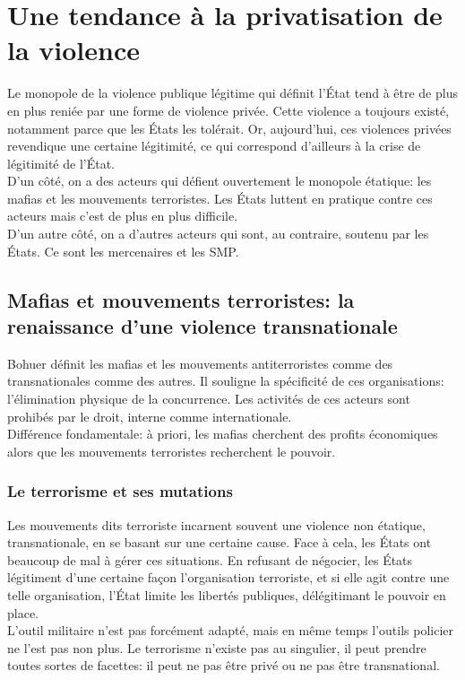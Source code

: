 \documentclass[10pt, a4paper, openany]{book}
\begin{document}
\section{Une tendance à la privatisation de la violence}

Le monopole de la violence publique légitime qui définit l'État tend à être de plus en plus reniée par une forme de violence privée. Cette violence a toujours existé, notamment parce que les États les tolérait. Or, aujourd'hui, ces violences privées revendique une certaine légitimité, ce qui correspond d'ailleurs à la crise de légitimité de l'État. \\
D'un côté, on a des acteurs qui défient ouvertement le monopole étatique: les mafias et les mouvements terroristes. Les États luttent en pratique contre ces acteurs mais c'est de plus en plus difficile. \\
D'un autre côté, on a d'autres acteurs qui sont, au contraire, soutenu par les États. Ce sont les mercenaires et les SMP.

\subsection{Mafias et mouvements terroristes: la renaissance d'une violence transnationale}

Bohuer définit les mafias et les mouvements antiterroristes comme des transnationales comme des autres. Il souligne la spécificité de ces organisations: l'élimination physique de la concurrence. Les activités de ces acteurs sont prohibés par le droit, interne comme internationale. \\
Différence fondamentale: à priori, les mafias cherchent des profits économiques alors que les mouvements terroristes recherchent le pouvoir. 

\subsubsection{Le terrorisme et ses mutations}

Les mouvements dits terroriste incarnent souvent une violence non étatique, transnationale, en se basant sur une certaine cause. Face à cela, les États ont beaucoup de mal à gérer ces situations. En refusant de négocier, les États légitiment d'une certaine façon l'organisation terroriste, et si elle agit contre une telle organisation, l'État limite les libertés publiques, délégitimant le pouvoir en place. \\
L'outil militaire n'est pas forcément adapté, mais en même temps l'outils policier ne l'est pas non plus. Le terrorisme n'existe pas au singulier, il peut prendre toutes sortes de facettes: il peut ne pas être privé ou ne pas être transnational. 
\end{document}
